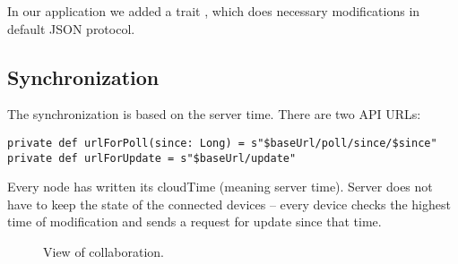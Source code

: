In our application we added a trait , which does necessary modifications in default JSON protocol. 

\subsection{Synchronization}
\label{subsection:akka-synchro}
The synchronization is based on the server time. 
There are two API URLs: 
\begin{verbatim}
private def urlForPoll(since: Long) = s"$baseUrl/poll/since/$since"
private def urlForUpdate = s"$baseUrl/update"
\end{verbatim}
Every node has written its cloudTime (meaning server time). Server does not have to keep the state of the connected devices -- every device checks the highest time of modification and sends a request for update since that time.


\begin{figure}[h]
	\centering
	\caption{View of collaboration.}
	\label{fig:screen-collaboration}
\end{figure}

